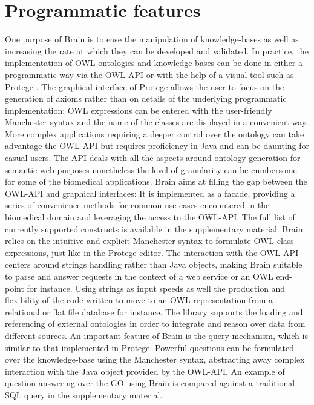 \documentclass{bioinfo}
\begin{document}
\section{Programmatic features}
One purpose of Brain is to ease the manipulation of knowledge-bases as well as increasing the rate at 
which they can be developed and validated.
In practice, the implementation of OWL ontologies and knowledge-bases can be done in either a programmatic way 
via the OWL-API \citep{MatthewHorridge2011} or with the
help of a visual tool such as Protege \citep{StanfordCenterforBiomedicalInformaticsResearch}. 
The graphical interface of Protege allows the user to focus 
on the generation of axioms rather than on details of the underlying programmatic implementation:
OWL expressions can be entered 
with the user-friendly Manchester syntax \citep{Horridge2006} and the name of the classes are displayed in a convenient way. 
More complex applications requiring a deeper control over the ontology
can take advantage the OWL-API but requires proficiency in Java and can be daunting for casual users.
The API deals with all the aspects around ontology generation for semantic web purposes nonetheless the 
level of granularity can be cumbersome for some of the biomedical applications. Brain aims at filling the gap between the OWL-API
and graphical interfaces: It is implemented as a facade, providing a series of convenience methods for common
use-cases encountered in the biomedical domain and leveraging the access to the OWL-API. 
The full list of currently supported constructs is available in the supplementary material.
Brain relies on the intuitive and explicit Manchester syntax to formulate OWL class expressions, just like in the Protege editor.
The interaction with the OWL-API centers around strings handling rather than Java objects, making Brain suitable to parse and answer requests in 
the context of a web service or an OWL end-point for instance. Using strings as input speeds as well the production 
and flexibility of the code written to move to an OWL representation from a relational or flat file database for instance.
The library supports the loading and referencing of external ontologies in order to integrate and reason
over data from different sources. An important feature of Brain is the query mechanism, which is similar to 
that implemented in Protege. Powerful questions can be formulated over the knowledge-base using the Manchester syntax, abstracting
away complex interaction with the Java object provided by the OWL-API. An example of question answering over the GO using Brain
is compared against a traditional SQL query in the supplementary material.
\end{document}

